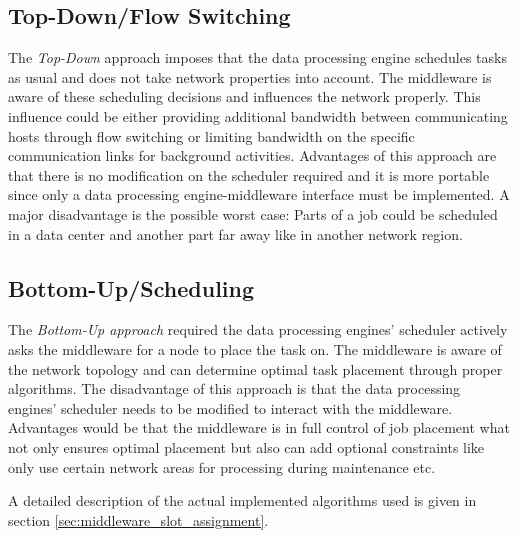 \subsection{Top-Down/Flow Switching}
The \textit{Top-Down} approach imposes that the data processing engine schedules tasks as usual and
does not take network properties into account. The middleware is aware of these scheduling decisions
and influences the network properly. This influence could be either providing additional bandwidth
between communicating hosts through flow switching or limiting bandwidth on the specific
communication links for background activities. Advantages of this approach are that there is no
modification on the scheduler required and it is more portable since only a data processing
engine-middleware interface must be implemented. A major disadvantage is the possible worst case:
Parts of a job could be scheduled in a data center and another part far away like in another network
region.

\subsection{Bottom-Up/Scheduling}
The \textit{Bottom-Up approach} required the data processing engines' scheduler actively asks the
middleware for a node to place the task on. The middleware is aware of the network topology and can
determine optimal task placement through proper algorithms. The disadvantage of this approach is
that the data processing engines' scheduler needs to be modified to interact with the middleware.
Advantages would be that the middleware is in full control of job placement what not only ensures
optimal placement but also can add optional constraints like only use certain network areas for
processing during maintenance etc.

A detailed description of the actual implemented algorithms used is given in section
\ref{sec:middleware_slot_assignment}.
